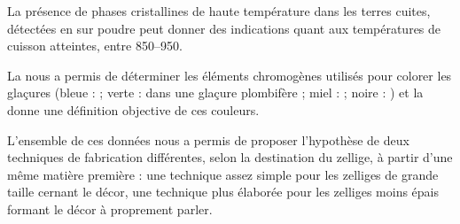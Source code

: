{La présence de phases cristallines de haute température dans 
les terres cuites, détectées en \DX sur poudre peut donner des 
indications quant aux températures de cuisson atteintes, entre 
\SIrange[range-phrase=\ et\ ]{850}{950}{\degC}.

La \SAO nous a permis de déterminer les éléments chromogènes utilisés 
pour colorer les glaçures (bleue :  ; verte :  
dans une glaçure plombifère ; miel :  ; noire : ) 
et la \CHRO donne une définition objective de ces couleurs.

L'ensemble de ces données nous a permis de proposer l'hypothèse de 
deux techniques de fabrication différentes, selon la destination du 
zellige, à partir d'une même matière première : une technique assez 
simple pour les zelliges de grande taille cernant le décor, une 
technique plus élaborée pour les zelliges moins épais formant le 
décor à proprement parler.

\vfill
}



